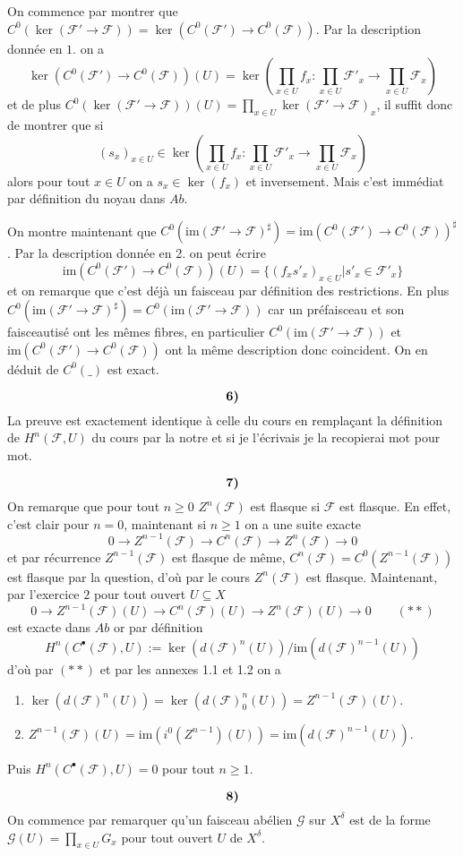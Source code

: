 \documentclass[a4paper,12pt]{article}
\newcommand{\F}{\mathscr F}
\newcommand{\im}{\textrm{im}}
\newcommand{\G}{\mathscr{G}}
\theoremstyle{plain}
\theoremstyle{definition}
\theoremstyle{remark}
\begin{document}
On commence par montrer que
$C^0(\ker(\F'\to \F))=\ker(C^0(\F')\to C^0(\F))$. Par la description
donnée en $1.$ on a 
\[\ker(C^0(\F')\to C^0(\F))(U)=\ker(\prod_{x\in U} f_x\colon \prod_{x\in U} \F'_x\to \prod_{x\in U} \F_x)\]
et de plus $C^0(\ker(\F'\to \F))(U)=\prod_{x\in U}\ker(\F'\to\F)_x$, 
il suffit donc de montrer que si 
\[(s_x)_{x\in U}\in \ker(\prod_{x\in U} f_x\colon \prod_{x\in U} \F'_x\to \prod_{x\in U} \F_x)\]
alors pour tout $x\in U$ on a $s_x\in \ker(f_x)$ et inversement.
Mais c'est immédiat par définition du noyau dans $Ab$. 

On montre maintenant que 
$C^0(\im(\F'\to \F)^\sharp)=\im(C^0(\F')\to C^0(\F))^\sharp$.
Par la description donnée en 2. on peut écrire 
\[\im(C^0(\F')\to C^0(\F))(U)=\{(f_xs'_x)_{x\in U}| s'_x\in \F'_x\}\]
et on remarque que c'est déjà un faisceau par définition des 
restrictions. En plus $C^0(\im(\F'\to \F)^\sharp)=C^0(\im(\F'\to\F))$
car un préfaisceau et son faisceautisé ont les mêmes fibres, en
particulier $C^0(\im(\F'\to\F))$ et $\im(C^0(\F')\to C^0(\F))$ ont 
la même description donc coincident. On en déduit de $C^0(\_)$ est
exact.

\[\textrm{\textbf{6)}}\]
La preuve est exactement identique à celle du cours en remplaçant
la définition de $H^n(\F, U)$ du cours par la notre et si je l'écrivais
je la recopierai mot pour mot.

\[\textrm{\textbf{7)}}\]
On remarque que pour tout $n\geq 0$ $Z^n(\F)$ est flasque si 
$\F$ est flasque. En effet, c'est clair pour $n=0$, maintenant si 
$n\geq 1$ on a une suite exacte 
\[0\to Z^{n-1}(\F)\to C^n(\F)\to Z^n(\F)\to 0\]
et par récurrence $Z^{n-1}(\F)$ est flasque de même, 
$C^n(\F)=C^0(Z^{n-1}(\F))$ est flasque par la question, d'où par le
cours $Z^n(\F)$ est flasque. Maintenant, par l'exercice $2$ pour tout
ouvert $U\subseteq X$ 
\[0\to Z^{n-1}(\F)(U)\to C^n(\F)(U)\to Z^n(\F)(U)\to 0\qquad (**)\]
est exacte dans $Ab$ or par définition 
\[H^n(C^\bullet(\F), U):=\ker(d(\F)^n(U))/\im(d(\F)^{n-1}(U))\]
d'où par $(**)$ et par les annexes 1.1 et 1.2 on a 
\begin{enumerate}
	\item $\ker(d(\F)^n(U))=\ker(d(\F)_0^n(U))=Z^{n-1}(\F)(U)$.
	\item $Z^{n-1}(\F)(U)=\im(i^0(Z^{n-1})(U))=\im(d(\F)^{n-1}(U))$.
\end{enumerate}
Puis $H^n(C^\bullet(\F),U)=0$ pour tout $n\geq 1$.


\[\textrm{\textbf{8)}}\]
On commence par remarquer qu'un faisceau abélien $\G$ sur $X^\delta$
est de la forme $\G(U)=\prod_{x\in U} G_x$ pour tout ouvert
$U$ de $X^\delta$.
\end{document}
